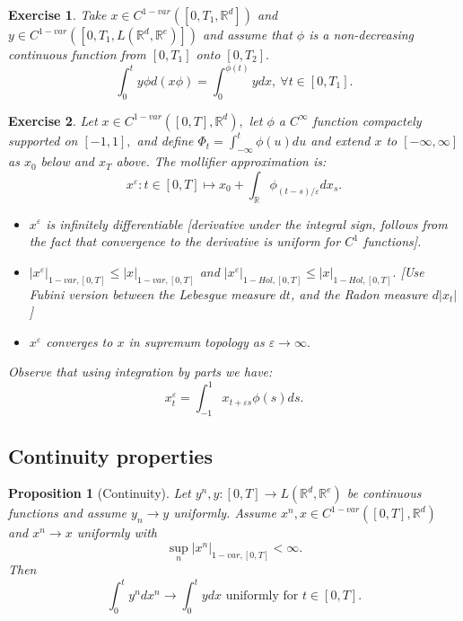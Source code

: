 \documentclass{article}
\newcommand{\R}{\mathbb{R}}
\newtheorem{prop}[theorem]{Proposition}
\newtheorem{exercise}{Exercise}
\begin{document}
\begin{exercise}
    Take $x \in C^{1-var}([0,T_1, \R^d])$ and $y \in C^{1-var}([0,T_1, L(\R^d,\R^e)])$ and assume that $\phi$ is a non-decreasing continuous function from $[0,T_1]$ onto $[0,T_2].$ 
    \begin{equation}
        \int_0^t y\phi d(x\phi) = \int_0^{\phi(t)} y dx, \ \forall t \in [0,T_1].
    \end{equation} 
\end{exercise}

\begin{exercise}
    Let $x \in C^{1-var}([0,T], \R^d),$ let $\phi$ a $C^{\infty}$ function compactely supported on $[-1,1],$ and define $\Phi_t = \int_{-\infty}^t \phi(u)du$ and extend $x$ to $[-\infty, \infty]$ as $x_0$ below and $x_T$ above.
    The \textit{mollifier approximation} is:
    \begin{equation}
        x^\varepsilon: t \in [0,T] \mapsto x_0 + \int_{\R} \phi_{(t-s) / \varepsilon} dx_s.
    \end{equation}

    \begin{itemize}
        \item $x^{\varepsilon}$ is infinitely differentiable [\textit{derivative under the integral sign, follows from the fact that convergence to the derivative is uniform for $C^1$ functions}].
        \item $|x^\varepsilon|_{1-var,[0,T]} \leq |x|_{1-var,[0,T]}$ and $|x^\varepsilon|_{1-Hol,[0,T]} \leq |x|_{1-Hol,[0,T]}.$ [\textit{Use Fubini version between the Lebesgue measure $dt$, and the Radon measure $d|x_t|$}]
        \item $x^{\varepsilon}$ converges to $x$ in supremum topology as $\varepsilon \rightarrow \infty.$
    \end{itemize}

    Observe that using integration by parts we have:
    \begin{equation}
        x_t^\varepsilon = \int_{-1}^1 x_{t + \varepsilon s} \phi(s) ds.
    \end{equation}
\end{exercise}

\subsection{Continuity properties}

\begin{prop}[Continuity]
    Let $y^n, y: [0,T] \rightarrow L(\R^d, \R^e)$ be continuous functions and assume $y_n \rightarrow y$ uniformly. Assume $x^n, x \in C^{1-var}([0,T], \R^d)$ and $x^n \rightarrow x$ uniformly with
    \begin{equation}
        \sup_n |x^n|_{1-var, [0,T]} < \infty.
    \end{equation} 
    Then 
    \begin{equation}
        \int_0^t y^n dx^n \rightarrow \int_0^t y dx \text{ uniformly for } t \in [0,T].
    \end{equation}
\end{prop}
\end{document}
